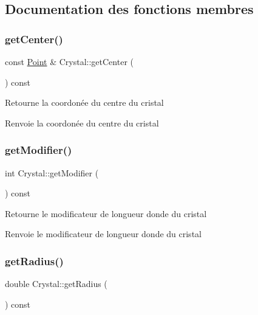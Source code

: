 \subsection{Documentation des fonctions membres}
\mbox{\label{class_crystal_a256caaa33e440e9a0822fd02fa254353}} 
\subsubsection{\texorpdfstring{getCenter()}{getCenter()}}
{\footnotesize\ttfamily const \mbox{\hyperlink{class_point}{Point}} \& Crystal\+::get\+Center (\begin{DoxyParamCaption}{ }\end{DoxyParamCaption}) const}

Retourne la coordonée du centre du cristal \begin{DoxyReturn}{Renvoie}
la coordonée du centre du cristal 
\end{DoxyReturn}
\mbox{\label{class_crystal_a31e3be3b9eae48eec045b8227d4a7e63}} 
\subsubsection{\texorpdfstring{getModifier()}{getModifier()}}
{\footnotesize\ttfamily int Crystal\+::get\+Modifier (\begin{DoxyParamCaption}{ }\end{DoxyParamCaption}) const}

Retourne le modificateur de longueur d\textquotesingle{}onde du cristal \begin{DoxyReturn}{Renvoie}
le modificateur de longueur d\textquotesingle{}onde du cristal 
\end{DoxyReturn}
\mbox{\label{class_crystal_ac776e15863abb706f8bddbeb9889a400}} 
\subsubsection{\texorpdfstring{getRadius()}{getRadius()}}
{\footnotesize\ttfamily double Crystal\+::get\+Radius (\begin{DoxyParamCaption}{ }\end{DoxyParamCaption}) const}

